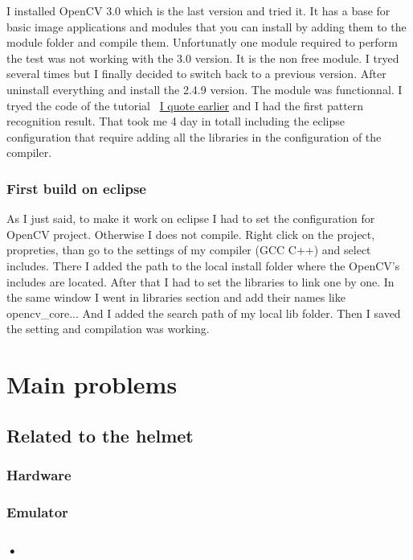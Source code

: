 \documentclass[english,a4paper,11pt]{report}
\begin{document}
	\par I installed OpenCV 3.0 which is the last version and tried it. It has a base for basic image applications and modules that you can install by adding them to the module folder and compile them. Unfortunatly one module required to perform the test was not working with the 3.0 version. It is the non free module. I tryed several times but I finally decided to switch back to a previous version. After uninstall everything and install the 2.4.9 version. The module was functionnal. I tryed the code of the tutorial ~\hyperlink{opencv}{I quote earlier} and I had the first pattern recognition result. That took me 4 day in totall including the eclipse configuration that require adding all the libraries in the configuration of the compiler.
	
	\subsubsection{First build on eclipse}	
	
	\par As I just said, to make it work on eclipse I had to set the configuration for OpenCV project. Otherwise I does not compile. Right click on the project, propreties, than	go to the settings of my compiler (GCC  C++) and select includes. There I added the path to the local install folder where the OpenCV's includes are located. After that I had to set the libraries to link one by one. In the same window I went in libraries section and add their names like opencv\_core... And I added the search path of my local lib folder. Then I saved the setting and compilation was working.
	
	
	\section{Main problems}	
	\subsection{Related to the helmet}
	\subsubsection{Hardware}
	\subsubsection{Emulator}
	\subsubsection{•}
	
\end{document}
